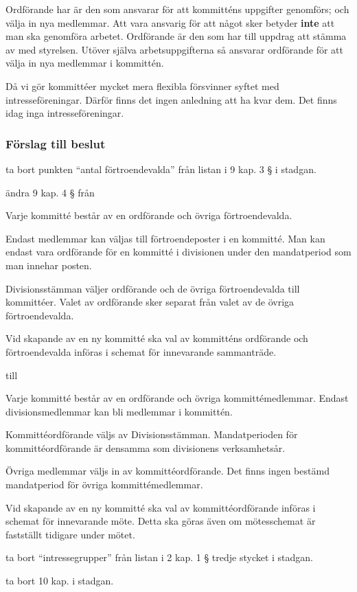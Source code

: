 \documentclass[protokoll]{dvd}
\begin{document}
Ordförande har är den som ansvarar för att kommitténs uppgifter genomförs; och välja in nya medlemmar.
Att vara ansvarig för att något sker betyder \textbf{inte} att man ska genomföra arbetet.
Ordförande är den som har till uppdrag att stämma av med styrelsen.
Utöver själva arbetsuppgifterna så ansvarar ordförande för att välja in nya medlemmar i kommittén.

Då vi gör kommittéer mycket mera flexibla försvinner syftet med intresseföreningar.
Därför finns det ingen anledning att ha kvar dem.
Det finns idag inga intresseföreningar.

\subsubsection*{Förslag till beslut}

\begin{attsatser}
	\item ta bort punkten ``antal förtroendevalda'' från listan i 9 kap. 3 § i stadgan.
	\item ändra 9 kap. 4 § från

	\begin{displayquote}
		Varje kommitté består av en ordförande och övriga förtroendevalda.

		Endast medlemmar kan väljas till förtroendeposter i en kommitté.
		Man kan endast vara ordförande för en kommitté i divisionen under den mandatperiod som man innehar posten.

		Divisionsstämman väljer ordförande och de övriga förtroendevalda till kommittéer.
		Valet av ordförande sker separat från valet av de övriga förtroendevalda.

		Vid skapande av en ny kommitté ska val av kommitténs ordförande och förtroendevalda införas i schemat för innevarande sammanträde.
	\end{displayquote}

	till

	\begin{displayquote}
		Varje kommitté består av en ordförande och övriga kommittémedlemmar.
		Endast divisionsmedlemmar kan bli medlemmar i kommittén.

		Kommittéordförande väljs av Divisionsstämman.
		Mandatperioden för kommittéordförande är densamma som divisionens verksamhetsår.

		Övriga medlemmar väljs in av kommittéordförande.
		Det finns ingen bestämd mandatperiod för övriga kommittémedlemmar.

		Vid skapande av en ny kommitté ska val av kommittéordförande införas i schemat för innevarande möte.
		Detta ska göras även om mötesschemat är fastställt tidigare under mötet.
	\end{displayquote}

	\item ta bort ``intressegrupper'' från listan i 2 kap. 1 § tredje stycket i stadgan.
	\item ta bort 10 kap. i stadgan.
\end{attsatser}
\end{document}
